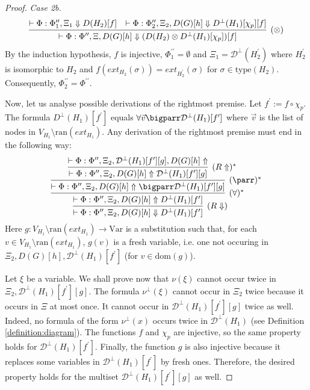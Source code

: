 \documentclass[a4paper,UKenglish,cleveref, autoref, thm-restate,pdfa]{lipics-v2021}
\newcommand{\eqdef}{:=}
\newcommand{\dom}{\mathrm{dom}}
\newcommand{\ran}{\mathrm{ran}}
\newcommand{\ext}{\mathit{ext}}
\newcommand{\type}{\mathrm{type}}
\newcommand{\Var}{\mathrm{Var}}
\newcommand{\mconj}{\otimes}
\newcommand{\mdisj}{\parr}
\newcommand{\bigmdisj}{\bigparr}
\newcommand{\diag}{\mathcal{D}}
\begin{document}
\begin{proof}
	\textit{Case 2b.}
	$$
	\infer[(\mconj)]
	{	\vdash \Phi : \Phi^{\prime\prime}, \Xi, D(G)[h] \Downarrow (D(H_2) \mconj D^\bot(H_1)[\chi_p])[f]	}
	{	\vdash \Phi : \Phi^{\prime\prime}_1, \Xi_1 \Downarrow D(H_2)[f] 		&		\vdash \Phi : \Phi^{\prime\prime}_2, \Xi_2, D(G)[h] \Downarrow D^\bot(H_1)[\chi_p][f]	}
	$$
	By the induction hypothesis, $f$ is injective, $\Phi_1^{\prime\prime}=\emptyset$ and $\Xi_1 = \diag^\bot(H_2^\prime)$ where $H_2^\prime$ is isomorphic to $H_2$ and $f(\ext_{H_2}(\sigma)) = \ext_{H_2^\prime}(\sigma)$ for $\sigma \in \type(H_2)$. Consequently, $\Phi_2^{\prime\prime} = \Phi^{\prime\prime}$.
	
	Now, let us analyse possible derivations of the rightmost premise. Let $f^\prime \eqdef f \circ \chi_p$. The formula $D^\bot(H_1)[f^\prime]$ equals $\forall \vec{v} \bigmdisj \diag^\bot(H_1)[f^\prime]$ where $\vec{v}$ is the list of nodes in $V_{H_1} \setminus \ran(\ext_{H_1})$. Any derivation of the rightmost premise must end in the following way:
	$$
	\infer[(R \Downarrow)]
	{	
		\vdash \Phi : \Phi^{\prime\prime}, \Xi_2, D(G)[h] \Downarrow D^\bot(H_1)[f^\prime]
	}
	{
		\infer[(\forall)^\ast]
		{	
			\vdash \Phi : \Phi^{\prime\prime}, \Xi_2, D(G)[h] \Uparrow D^\bot(H_1)[f^\prime]
		}
		{
			\infer[(\mdisj)^\ast]
			{	
				\vdash \Phi : \Phi^{\prime\prime}, \Xi_2, D(G)[h] \Uparrow \bigmdisj \diag^\bot(H_1)[f^\prime][g]
			}
			{
				\infer[(R \Uparrow)^\ast]
				{	
					\vdash \Phi : \Phi^{\prime\prime}, \Xi_2, D(G)[h] \Uparrow \diag^\bot(H_1)[f^\prime][g]
				}
				{
					\vdash \Phi : \Phi^{\prime\prime}, \Xi_2, \diag^\bot(H_1)[f^\prime][g], D(G)[h] \Uparrow 
				}
			}
		}
	}
	$$
	Here $g:V_{H_1} \setminus \ran(\ext_{H_1}) \to \Var$ is a substitution such that, for each $v \in V_{H_1} \setminus \ran(\ext_{H_1})$, $g(v)$ is a fresh variable, i.e. one not occuring in $\Xi_2,D(G)[h],\diag^\bot(H_1)[f^\prime]$ (for $v \in \dom(g)$). 
	
	Let $\xi$ be a variable. We shall prove now that $\nu(\xi)$ cannot occur twice in $\Xi_2,\diag^\bot(H_1)[f^\prime][g]$. The formula $\nu^\bot(\xi)$ cannot occur in $\Xi_2$ twice because it occurs in $\Xi$ at most once. It cannot occur in $\diag^\bot(H_1)[f^\prime][g]$ twice as well. Indeed, no formula of the form $\nu^\bot(x)$ occurs twice in $\diag^\bot(H_1)$ (see Definition \ref{definition:diagram}). The functions $f$ and $\chi_p$ are injective, so the same property holds for $\diag^\bot(H_1)[f^\prime]$. Finally, the function $g$ is also injective because it replaces some variables in $\diag^\bot(H_1)[f^\prime]$ by fresh ones. Therefore, the desired property holds for the multiset $\diag^\bot(H_1)[f^\prime][g]$ as well.
	

\end{proof}
\end{document}
